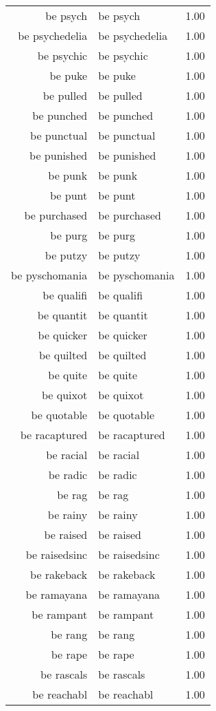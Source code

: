 \begin{table}[ht]
\begin{tabular}{rlr}
  be psych & be psych & 1.00 \\ 
  be psychedelia & be psychedelia & 1.00 \\ 
  be psychic & be psychic & 1.00 \\ 
  be puke & be puke & 1.00 \\ 
  be pulled & be pulled & 1.00 \\ 
  be punched & be punched & 1.00 \\ 
  be punctual & be punctual & 1.00 \\ 
  be punished & be punished & 1.00 \\ 
  be punk & be punk & 1.00 \\ 
  be punt & be punt & 1.00 \\ 
  be purchased & be purchased & 1.00 \\ 
  be purg & be purg & 1.00 \\ 
  be putzy & be putzy & 1.00 \\ 
  be pyschomania & be pyschomania & 1.00 \\ 
  be qualifi & be qualifi & 1.00 \\ 
  be quantit & be quantit & 1.00 \\ 
  be quicker & be quicker & 1.00 \\ 
  be quilted & be quilted & 1.00 \\ 
  be quite & be quite & 1.00 \\ 
  be quixot & be quixot & 1.00 \\ 
  be quotable & be quotable & 1.00 \\ 
  be racaptured & be racaptured & 1.00 \\ 
  be racial & be racial & 1.00 \\ 
  be radic & be radic & 1.00 \\ 
  be rag & be rag & 1.00 \\ 
  be rainy & be rainy & 1.00 \\ 
  be raised & be raised & 1.00 \\ 
  be raisedsinc & be raisedsinc & 1.00 \\ 
  be rakeback & be rakeback & 1.00 \\ 
  be ramayana & be ramayana & 1.00 \\ 
  be rampant & be rampant & 1.00 \\ 
  be rang & be rang & 1.00 \\ 
  be rape & be rape & 1.00 \\ 
  be rascals & be rascals & 1.00 \\ 
  be reachabl & be reachabl & 1.00 \\ 

\end{tabular}
\end{table}
